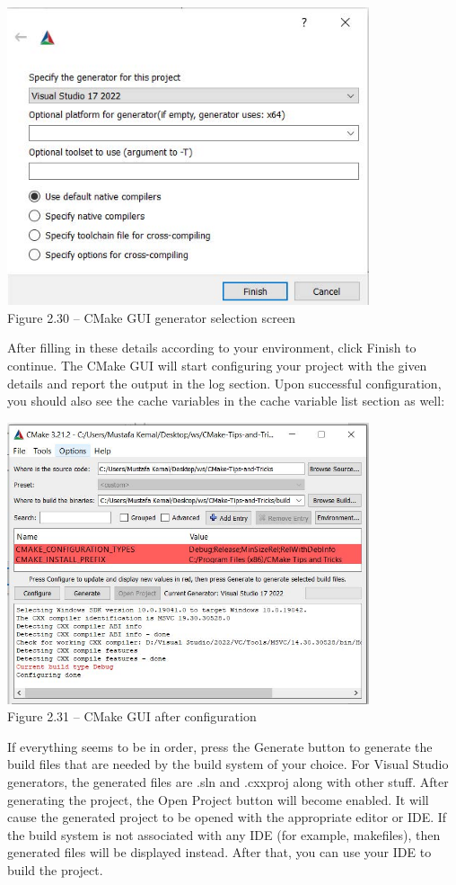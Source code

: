 \begin{center}
\includegraphics[width=0.8\textwidth]{content/1/chapter2/images/30.jpg}\\
Figure 2.30 – CMake GUI generator selection screen
\end{center}

After filling in these details according to your environment, click Finish to continue. The CMake GUI will start configuring your project with the given details and report the output in the log section. Upon successful configuration, you should also see the cache variables in the cache variable list section as well:

\begin{center}
\includegraphics[width=0.8\textwidth]{content/1/chapter2/images/31.jpg}\\
Figure 2.31 – CMake GUI after configuration
\end{center}

If everything seems to be in order, press the Generate button to generate the build files that are needed by the build system of your choice. For Visual Studio generators, the generated files are .sln and .cxxproj along with other stuff. After generating the project, the Open Project button will become enabled. It will cause the generated project to be opened with the appropriate editor or IDE. If the build system is not associated with any IDE (for example, makefiles), then generated files will be displayed instead. After that, you can use your IDE to build the project.

